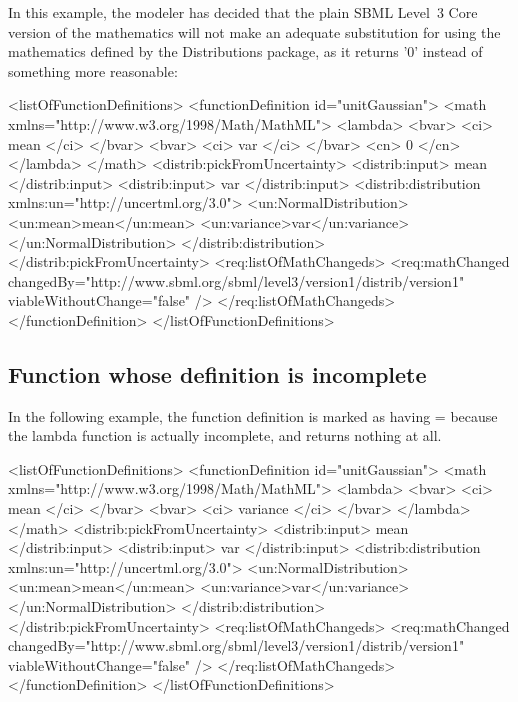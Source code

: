 In this example, the modeler has decided that the plain SBML Level~3 Core version of the mathematics will not make an adequate substitution for using the mathematics defined by the Distributions package, as it returns '0' instead of something more reasonable:

\begin{example}
<listOfFunctionDefinitions> 
  <functionDefinition id="unitGaussian"> 
    <math xmlns="http://www.w3.org/1998/Math/MathML"> 
      <lambda>
        <bvar>
          <ci> mean </ci>
        </bvar>
        <bvar>
          <ci> var </ci>
        </bvar>
        <cn> 0 </cn>
      </lambda>
    </math> 
    <distrib:pickFromUncertainty>
      <distrib:input> mean </distrib:input>
      <distrib:input> var </distrib:input>
      <distrib:distribution xmlns:un="http://uncertml.org/3.0">
         <un:NormalDistribution>
           <un:mean>mean</un:mean>
           <un:variance>var</un:variance>
         </un:NormalDistribution>
      </distrib:distribution>
    </distrib:pickFromUncertainty>
    <req:listOfMathChangeds>
      <req:mathChanged changedBy="http://www.sbml.org/sbml/level3/version1/distrib/version1"
                       viableWithoutChange="false" />
    </req:listOfMathChangeds>
  </functionDefinition> 
</listOfFunctionDefinitions> 
\end{example} 


\subsection{Function whose definition is incomplete}

In the following example, the function definition is marked as having = because the lambda function is actually incomplete, and returns nothing at all.

\begin{example}
<listOfFunctionDefinitions> 
  <functionDefinition id="unitGaussian"> 
    <math xmlns="http://www.w3.org/1998/Math/MathML"> 
      <lambda>
        <bvar>
          <ci> mean </ci>
        </bvar>
        <bvar>
          <ci> variance </ci>
        </bvar>
      </lambda>
    </math> 
    <distrib:pickFromUncertainty>
      <distrib:input> mean </distrib:input>
      <distrib:input> var </distrib:input>
      <distrib:distribution xmlns:un="http://uncertml.org/3.0">
         <un:NormalDistribution>
           <un:mean>mean</un:mean>
           <un:variance>var</un:variance>
         </un:NormalDistribution>
      </distrib:distribution>
    </distrib:pickFromUncertainty>
    <req:listOfMathChangeds>
      <req:mathChanged changedBy="http://www.sbml.org/sbml/level3/version1/distrib/version1"
                       viableWithoutChange="false" />
    </req:listOfMathChangeds>
  </functionDefinition> 
</listOfFunctionDefinitions> 
\end{example}
